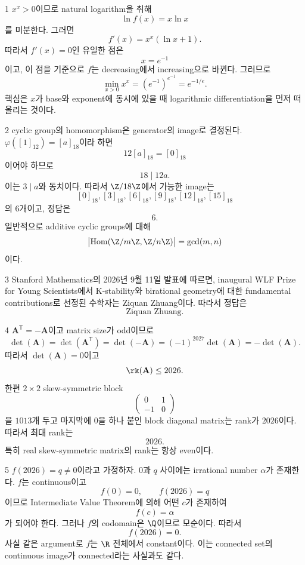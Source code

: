 \documentclass[11pt,oneside]{article}
\begin{document}

\begin{problemsolution}{1}
$x^x>0$이므로 natural logarithm을 취해
\[
    \ln f(x)=x\ln x
\]
를 미분한다. 그러면
\[
    f'(x)=x^x(\ln x+1).
\]
따라서 $f'(x)=0$인 유일한 점은
\[
    x=e^{-1}
\]
이고, 이 점을 기준으로 $f$는 decreasing에서 increasing으로 바뀐다. 그러므로
\[
    \min_{x>0}x^x
    =\left(e^{-1}\right)^{e^{-1}}
    =\boxed{e^{-1/e}}.
\]
핵심은 $x$가 base와 exponent에 동시에 있을 때 logarithmic differentiation을 먼저 떠올리는 것이다.
\end{problemsolution}

\begin{problemsolution}{2}
cyclic group의 homomorphism은 generator의 image로 결정된다.
$\varphi([1]_{12})=[a]_{18}$이라 하면
\[
    12[a]_{18}=[0]_{18}
\]
이어야 하므로
\[
    18\mid12a.
\]
이는 $3\mid a$와 동치이다. 따라서 $\Z/18\Z$에서 가능한 image는
\[
    [0]_{18},[3]_{18},[6]_{18},[9]_{18},[12]_{18},[15]_{18}
\]
의 $6$개이고, 정답은
\[
    \boxed{6}.
\]
일반적으로 additive cyclic groups에 대해
\[
    \bigl|\operatorname{Hom}(\Z/m\Z,\Z/n\Z)\bigr|=\gcd(m,n)
\]
이다.
\end{problemsolution}

\begin{problemsolution}{3}
Stanford Mathematics의 2026년 9월 11일 발표에 따르면, inaugural WLF Prize for Young Scientists에서 K-stability와 birational geometry에 대한 fundamental contributions로 선정된 수학자는 Ziquan Zhuang이다. 따라서 정답은
\[
    \boxed{\text{Ziquan Zhuang}}.
\]
\end{problemsolution}

\begin{problemsolution}{4}
$\mathbf{A}^{\mathsf T}=-\mathbf{A}$이고 matrix size가 odd이므로
\[
    \det(\mathbf{A})
    =\det(\mathbf{A}^{\mathsf T})
    =\det(-\mathbf{A})
    =(-1)^{2027}\det(\mathbf{A})
    =-\det(\mathbf{A}).
\]
따라서 $\det(\mathbf{A})=0$이고
\[
    \rk(\mathbf{A})\leq2026.
\]
한편 $2\times2$ skew-symmetric block
\[
    \begin{pmatrix}
        0&1\\
        -1&0
    \end{pmatrix}
\]
을 $1013$개 두고 마지막에 $0$을 하나 붙인 block diagonal matrix는 rank가 $2026$이다. 따라서 최대 rank는
\[
    \boxed{2026}.
\]
특히 real skew-symmetric matrix의 rank는 항상 even이다.
\end{problemsolution}

\begin{problemsolution}{5}
$f(2026)=q\neq0$이라고 가정하자. $0$과 $q$ 사이에는 irrational number $\alpha$가 존재한다. $f$는 continuous이고
\[
    f(0)=0,
    \qquad
    f(2026)=q
\]
이므로 Intermediate Value Theorem에 의해 어떤 $c$가 존재하여
\[
    f(c)=\alpha
\]
가 되어야 한다. 그러나 $f$의 codomain은 $\Q$이므로 모순이다. 따라서
\[
    \boxed{f(2026)=0}.
\]
사실 같은 argument로 $f$는 $\R$ 전체에서 constant이다. 이는 connected set의 continuous image가 connected라는 사실과도 같다.
\end{problemsolution}
\end{document}
